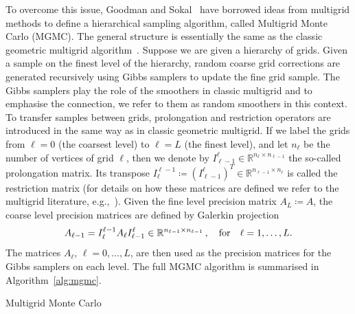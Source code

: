 \documentclass[
fontsize=11pt,
paper=a4,
numbers=noenddot
]{scrartcl}
\begin{document}
To overcome this issue, Goodman and Sokal~\cite{goodmansokal} have borrowed ideas from multigrid methods to define a hierarchical sampling algorithm, called Multigrid Monte Carlo (MGMC). The general structure is essentially the same as the classic geometric multigrid algorithm~\cite{hackbuschMultiGridMethodsApplications1985}. Suppose we are given a hierarchy of grids. Given a sample on the finest level of the hierarchy, random coarse grid corrections are generated recursively using Gibbs samplers to update the fine grid sample. The Gibbs samplers play the role of the smoothers in classic multigrid and to emphasise the connection, we refer to them as random smoothers in this context. To transfer samples between grids, prolongation and restriction operators are introduced in the same way as in classic  geometric multigrid. If we label the grids from $\ell = 0$ (the coarsest level) to $\ell = L$ (the finest level), and let $n_\ell$ be the number of vertices of grid $\ell$, then we denote by $I_{\ell-1}^\ell \in \mathbb{R}^{n_\ell \times n_{\ell - 1}}$ the so-called prolongation matrix. Its transpose $I_{\ell}^{\ell-1} \coloneqq {(I_{\ell-1}^\ell)}^T \in \mathbb{R}^{n_{\ell - 1} \times n_{\ell}}$ is called the restriction matrix (for details on how these matrices are defined we refer to the multigrid literature, e.g.,~\cite{hackbuschMultiGridMethodsApplications1985}). Given the fine level precision matrix $A_L \coloneqq A$, the coarse level precision matrices are defined by Galerkin projection
\begin{equation}
  \label{eq:galerkin}
    A_{\ell-1} = I_\ell^{\ell - 1} A_\ell I_{\ell-1}^\ell \in \mathbb{R}^{n_{\ell-1} \times n_{\ell-1}}\,, \quad \text{for\quad$\ell = 1, \dotsc, L$.}
\end{equation}
The matrices $A_\ell$, $\ell = 0, \dotsc, L$, are then used as the precision matrices for the Gibbs samplers on each level. The full MGMC algorithm is summarised in Algorithm~\ref{alg:mgmc}.

\begin{algorithm}
    \DontPrintSemicolon



    \SetAlgoLined

    \caption{Multigrid Monte Carlo}\label{alg:mgmc}
\end{algorithm}
\end{document}
